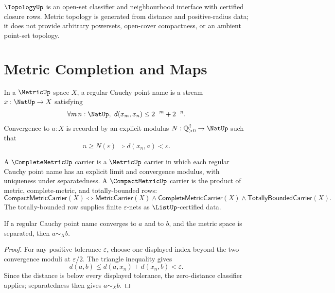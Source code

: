 \begin{principle}
\label{prin:countable-completion-topology-boundary}
$\TopologyUp$ is an open-set classifier and neighbourhood interface with
certified closure rows.  Metric topology is generated from distance and
positive-radius data; it does not provide arbitrary powersets, open-cover
compactness, or an ambient point-set topology.
\end{principle}

\section{Metric Completion and Maps}
\label{sec:countable-completion-metric-completion-maps}

\begin{definition}
\label{def:countable-completion-cauchy-point-name}
In a $\MetricUp$ space $X$, a regular Cauchy point name is a stream
$x:\NatUp\to X$ satisfying
$$
\forall m\,n:\NatUp,\ d(x_m,x_n)\le 2^{-m}+2^{-n}.
$$
Convergence to $a:X$ is recorded by an explicit modulus
$N:\mathbb Q_{>0}^{\uparrow}\to\NatUp$ such that
$$
n\ge N(\varepsilon)\Longrightarrow d(x_n,a)<\varepsilon.
$$
\end{definition}

\begin{definition}
\label{def:countable-completion-complete-compact-carriers}
A $\CompleteMetricUp$ carrier is a $\MetricUp$ carrier in which each regular
Cauchy point name has an explicit limit and convergence modulus, with
uniqueness under separatedness.  A $\CompactMetricUp$ carrier is the product
of metric, complete-metric, and totally-bounded rows:
$$
\mathsf{CompactMetricCarrier}(X)
\Longleftrightarrow
\mathsf{MetricCarrier}(X)\wedge
\mathsf{CompleteMetricCarrier}(X)\wedge
\mathsf{TotallyBoundedCarrier}(X).
$$
The totally-bounded row supplies finite $\varepsilon$-nets as
$\ListUp$-certified data.
\end{definition}

\begin{theorem}
\label{thm:countable-completion-limit-uniqueness-separated}
If a regular Cauchy point name converges to $a$ and to $b$, and the metric
space is separated, then $a\sim_X b$.
\end{theorem}

\begin{proof}
For any positive tolerance $\varepsilon$, choose one displayed index beyond
the two convergence moduli at $\varepsilon/2$.  The triangle inequality gives
$$
d(a,b)\le d(a,x_n)+d(x_n,b)<\varepsilon.
$$
Since the distance is below every displayed tolerance, the zero-distance
classifier applies; separatedness then gives $a\sim_X b$.
\end{proof}

